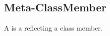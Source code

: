 \subsection{Meta-ClassMember}
\label{concept-Meta-ClassMember}

A  is a  reflecting a class member.




